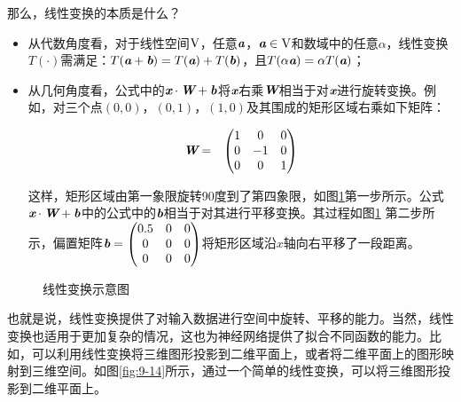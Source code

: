 \parinterval 那么，线性变换的本质是什么？

\begin{itemize}
\vspace{0.5em}
\item 从代数角度看，对于线性空间$ \textrm V $，任意$ {\textbf{\em a}}$，${\textbf{\em a}}\in {\textrm V} $和数域中的任意$ \alpha $，线性变换$ T(\cdot) $需满足：$ T({\textbf{\em a}}+{\textbf{\em b}})=T({\textbf{\em a}})+T({\textbf{\em b}}) $，且$ T(\alpha {\textbf{\em a}})=\alpha T({\textbf{\em a}}) $；
\vspace{0.5em}
\item 从几何角度看，公式中的${\textbf{\em x}}\cdot {\textbf{\em W}}+{\textbf{\em b}}$将${\textbf{\em x}}$右乘${\textbf{\em W}}$相当于对$ {\textbf{\em x}} $进行旋转变换。例如，对三个点$ (0,0) $，$ (0,1) $，$ (1,0) $及其围成的矩形区域右乘如下矩阵：

    \begin{eqnarray}
    {\textbf{\em W}}&=&\begin{pmatrix} 1 & 0 & 0\\ 0 & -1 & 0\\ 0 & 0 & 1\end{pmatrix}
    \label{eq:9-106}
    \end{eqnarray}

    这样，矩形区域由第一象限旋转90度到了第四象限，如图\ref{fig:9-13}第一步所示。公式$ {\textbf{\em x}}\cdot {\textbf{\em W}}+{\textbf{\em b}}$中的公式中的${\textbf{\em b}}$相当于对其进行平移变换。其过程如图\ref{fig:9-13} 第二步所示，偏置矩阵$ {\textbf{\em b}}=\begin{pmatrix} 0.5 & 0 & 0\\ 0 & 0 & 0\\ 0 & 0 & 0\end{pmatrix} $将矩形区域沿$x$轴向右平移了一段距离。
\vspace{0.5em}
\end{itemize}

\begin{figure}[htp]
\centering

\caption{线性变换示意图}
\label{fig:9-13}
\end{figure}

\parinterval 也就是说，线性变换提供了对输入数据进行空间中旋转、平移的能力。当然，线性变换也适用于更加复杂的情况，这也为神经网络提供了拟合不同函数的能力。比如，可以利用线性变换将三维图形投影到二维平面上，或者将二维平面上的图形映射到三维空间。如图\ref{fig:9-14}所示，通过一个简单的线性变换，可以将三维图形投影到二维平面上。

